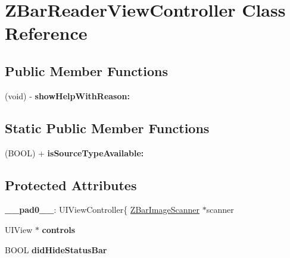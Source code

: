 \hypertarget{interface_z_bar_reader_view_controller}{
\section{ZBarReaderViewController Class Reference}
\label{interface_z_bar_reader_view_controller}
}
\subsection*{Public Member Functions}
\begin{DoxyCompactItemize}
\item 
\hypertarget{interface_z_bar_reader_view_controller_ad5f531b90d72ff492e8991e4867ffb00}{
(void) -\/ {\bfseries showHelpWithReason:}}
\label{interface_z_bar_reader_view_controller_ad5f531b90d72ff492e8991e4867ffb00}

\end{DoxyCompactItemize}
\subsection*{Static Public Member Functions}
\begin{DoxyCompactItemize}
\item 
\hypertarget{interface_z_bar_reader_view_controller_adb6eaaf2840eb0e9d8b75ce1f05b769c}{
(BOOL) + {\bfseries isSourceTypeAvailable:}}
\label{interface_z_bar_reader_view_controller_adb6eaaf2840eb0e9d8b75ce1f05b769c}

\end{DoxyCompactItemize}
\subsection*{Protected Attributes}
\begin{DoxyCompactItemize}
\item 
\hypertarget{interface_z_bar_reader_view_controller_a70874f6630c2bc8173f3ade6b0b06850}{
{\bfseries \_\-\_\-pad0\_\-\_\-}: UIViewController\{ \hyperlink{interface_z_bar_image_scanner}{ZBarImageScanner} $\ast$scanner}
\label{interface_z_bar_reader_view_controller_a70874f6630c2bc8173f3ade6b0b06850}

\item 
\hypertarget{interface_z_bar_reader_view_controller_a5df3b18e0f3975a613420e1e7a8152ee}{
UIView $\ast$ {\bfseries controls}}
\label{interface_z_bar_reader_view_controller_a5df3b18e0f3975a613420e1e7a8152ee}

\item 
\hypertarget{interface_z_bar_reader_view_controller_aa95cc5a63f11be8458fccd6f698db484}{
BOOL {\bfseries didHideStatusBar}}
\label{interface_z_bar_reader_view_controller_aa95cc5a63f11be8458fccd6f698db484}

\end{DoxyCompactItemize}
